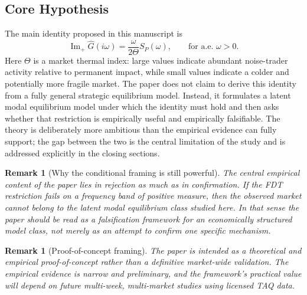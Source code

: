 \documentclass[11pt]{article}
\newtheorem{remark}[theorem]{Remark}
\newcommand{\Ghat}{\widehat{G}}
\newcommand{\ImPart}{\operatorname{Im}_{\!+}}
\begin{document}
\subsection{Core Hypothesis}
The main identity proposed in this manuscript is
\begin{equation}\label{eq:main-fdt}
  \ImPart \Ghat(i\omega)=\frac{\omega}{2\Theta}S_P(\omega),
  \qquad \text{for a.e.\ }\omega>0.
\end{equation}
Here $\Theta$ is a market thermal index: large values indicate abundant noise-trader activity relative to permanent impact, while small values indicate a colder and potentially more fragile market.
The paper does not claim to derive this identity from a fully general strategic equilibrium model. Instead, it formulates a latent modal equilibrium model under which the identity must hold and then asks whether that restriction is empirically useful and empirically falsifiable. The theory is deliberately more ambitious than the empirical evidence can fully support; the gap between the two is the central limitation of the study and is addressed explicitly in the closing sections.

\begin{remark}[Why the conditional framing is still powerful]
The central empirical content of the paper lies in rejection as much as in confirmation. If the FDT restriction fails on a frequency band of positive measure, then the observed market cannot belong to the latent modal equilibrium class studied here. In that sense the paper should be read as a falsification framework for an economically structured model class, not merely as an attempt to confirm one specific mechanism.
\end{remark}

\begin{remark}[Proof-of-concept framing]
The paper is intended as a theoretical and empirical proof-of-concept rather than a definitive market-wide validation. The empirical evidence is narrow and preliminary, and the framework's practical value will depend on future multi-week, multi-market studies using licensed TAQ data.
\end{remark}
\end{document}
